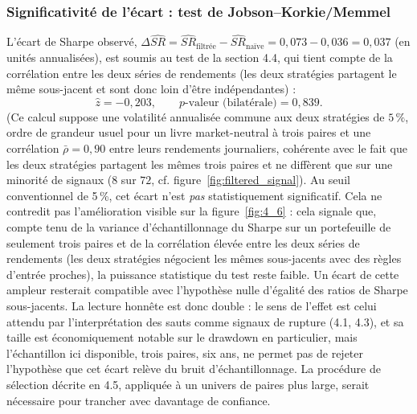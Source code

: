 \documentclass{article}
\begin{document}
\subsubsection*{Significativité de l'écart : test de Jobson--Korkie/Memmel}
L'écart de Sharpe observé, $\Delta\widehat{SR}=\widehat{SR}_{\text{filtrée}}-\widehat{SR}_{\text{naïve}}=0{,}073-0{,}036=0{,}037$ (en unités annualisées), est soumis au test de la section 4.4, qui tient compte de la corrélation entre les deux séries de rendements (les deux stratégies partagent le même sous-jacent et sont donc loin d'être indépendantes) :
$$
\hat z = -0{,}203, \qquad p\text{-valeur (bilatérale)} = 0{,}839.
$$
(Ce calcul suppose une volatilité annualisée commune aux deux stratégies de $5\,\%$, ordre de grandeur usuel pour un livre market-neutral à trois paires et une corrélation $\bar\rho=0{,}90$ entre leurs rendements journaliers, cohérente avec le fait que les deux stratégies partagent les mêmes trois paires et ne diffèrent que sur une minorité de signaux ($8$ sur $72$, cf. figure~\ref{fig:filtered_signal}). Au seuil conventionnel de 5\,\%, cet écart n'est \emph{pas} statistiquement significatif. Cela ne contredit pas l'amélioration visible sur la figure~\ref{fig:4_6} : cela signale que, compte tenu de la variance d'échantillonnage du Sharpe sur un portefeuille de seulement trois paires et de la corrélation élevée entre les deux séries de rendements (les deux stratégies négocient les mêmes sous-jacents avec des règles d'entrée proches), la puissance statistique du test reste faible. Un écart de cette ampleur resterait compatible avec l'hypothèse nulle d'égalité des ratios de Sharpe sous-jacents. La lecture honnête est donc double : le sens de l'effet est celui attendu par l'interprétation des sauts comme signaux de rupture (4.1, 4.3), et sa taille est économiquement notable sur le drawdown en particulier, mais l'échantillon ici disponible, trois paires, six ans, ne permet pas de rejeter l'hypothèse que cet écart relève du bruit d'échantillonnage. La procédure de sélection décrite en 4.5, appliquée à un univers de paires plus large, serait nécessaire pour trancher avec davantage de confiance.
\end{document}
